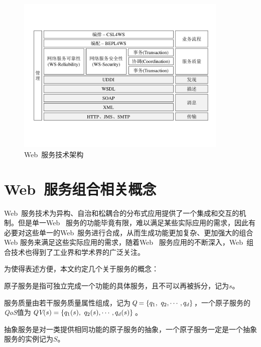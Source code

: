 \begin{figure}[thb]
    \centering
    \includegraphics[width=0.9\textwidth]{./FIGs/Fig_WSTechArc.pdf}
    \caption{Web~服务技术架构}
    \label{F:Fig_WSTechArc}
\end{figure}


\section{Web~服务组合相关概念}

Web~服务技术为异构、自治和松耦合的分布式应用提供了一个集成和交互的机制。但是单一Web~ 服务的功能毕竟有限，难以满足某些实际应用的需求，因此有必要对这些单一的Web~服务进行合成，从而生成功能更加复杂、更加强大的组合Web 服务来满足这些实际应用的需求，随着Web~ 服务应用的不断深入，Web~组合技术也得到了工业界和学术界的广泛关注。

为使得表述方便，本文约定几个关于服务的概念：

\begin{definition}[原子服务]
    原子服务是指可独立完成一个功能的具体服务，且不可以再被拆分，记为$s$。
\end{definition}

\begin{definition}[服务质量QoS]
    服务质量由若干服务质量属性组成，记为$\emph{Q}=\{q_{1},\ q_{2}, \cdots, q_{d}\}$，一个原子服务的\emph{QoS}值为$\emph{QV}(s)=\{q_{1}(s),\ q_{2}(s), \cdots, q_{d}(s)\}$。
\end{definition}

\begin{definition}[抽象服务]
    抽象服务是对一类提供相同功能的原子服务的抽象，一个原子服务一定是一个抽象服务的实例记为$S$。
\end{definition}

